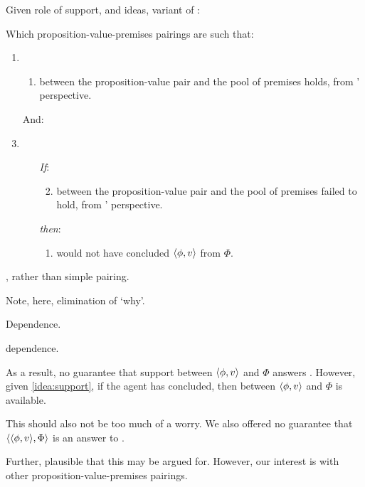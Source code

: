\begin{note}
  Given role of support, and ideas, variant of \qWhy{}:

  \begin{question}[\qWhyV{}]
    \label{q:why:v}
    Which proposition-value-premises pairings are such that:

    \begin{enumerate}[label=]
    \item
      \begin{enumerate}[label=\alph*., ref=(\alph*)]
      \item
         between the proposition-value pair and the pool of premises holds, from \vAgent{}' perspective.
      \end{enumerate}
    \item[And:]
    \item
      \begin{enumerate}
      \item[\emph{If}:]
        \begin{enumerate}[label=\alph*., ref=(\alph*), resume]
          \setcounter{enumiii}{1}
        \item
           between the proposition-value pair and the pool of premises failed to hold, from \vAgent{}' perspective.
        \end{enumerate}
      \item[\emph{then}:]
        \begin{enumerate}[label=\alph*., ref=(\alph*), resume]
        \item \vAgent{} would not have concluded \(\langle \phi, v \rangle\) from \(\Phi\).
        \end{enumerate}
      \end{enumerate}
    \end{enumerate}
\end{question}

  \support{}, rather than simple pairing.

  Note, here, elimination of `why'.

  Dependence.
\end{note}

\begin{note}
  \qWhyV{} dependence.

  As a result, no guarantee that support between \(\langle \phi, v \rangle\) and \(\Phi\) answers \qWhyV{}.
  However, given \autoref{idea:support}, if the agent has concluded, then \support{} between \(\langle \phi, v \rangle\) and \(\Phi\) is available.

  This should also not be too much of a worry.
  We also offered no guarantee that \(\langle \langle \phi, v \rangle, \Phi \rangle\) is an answer to \qWhy{}.

  Further, plausible that this may be argued for.
  However, our interest is with other proposition-value-premises pairings.
\end{note}

